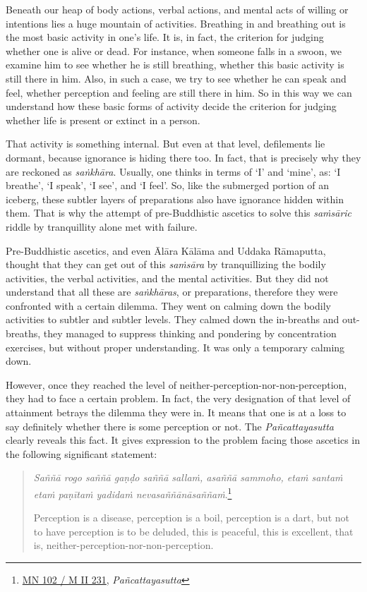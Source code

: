 Beneath our heap of body actions, verbal actions, and mental acts of willing or intentions lies a huge mountain of activities. Breathing in and breathing out is the most basic activity in one's life. It is, in fact, the criterion for judging whether one is alive or dead. For instance, when someone falls in a swoon, we examine him to see whether he is still breathing, whether this basic activity is still there in him. Also, in such a case, we try to see whether he can speak and feel, whether perception and feeling are still there in him. So in this way we can understand how these basic forms of activity decide the criterion for judging whether life is present or extinct in a person.

That activity is something internal. But even at that level, defilements lie dormant, because ignorance is hiding there too. In fact, that is precisely why they are reckoned as \emph{saṅkhāra}. Usually, one thinks in terms of `I' and `mine', as: `I breathe', `I speak', `I see', and `I feel'. So, like the submerged portion of an iceberg, these subtler layers of preparations also have ignorance hidden within them. That is why the attempt of pre-Buddhistic ascetics to solve this \emph{saṁsāric} riddle by tranquillity alone met with failure.

Pre-Buddhistic ascetics, and even Ālāra Kālāma and Uddaka Rāmaputta, thought that they can get out of this \emph{saṁsāra} by tranquillizing the bodily activities, the verbal activities, and the mental activities. But they did not understand that all these are \emph{saṅkhāras}, or preparations, therefore they were confronted with a certain dilemma. They went on calming down the bodily activities to subtler and subtler levels. They calmed down the in-breaths and out-breaths, they managed to suppress thinking and pondering by concentration exercises, but without proper understanding. It was only a temporary calming down.

However, once they reached the level of neither-perception-nor-non-perception, they had to face a certain problem. In fact, the very designation of that level of attainment betrays the dilemma they were in. It means that one is at a loss to say definitely whether there is some perception or not. The \emph{Pañcattayasutta} clearly reveals this fact. It gives expression to the problem facing those ascetics in the following significant statement:

\begin{quote}
\emph{Saññā rogo saññā gaṇḍo saññā sallaṁ, asaññā sammoho, etaṁ santaṁ etaṁ paṇītaṁ yadidaṁ nevasaññānāsaññaṁ}.\footnote{\href{https://suttacentral.net/mn102/pli/ms}{MN 102 / M II 231}, \emph{Pañcattayasutta}}

Perception is a disease, perception is a boil, perception is a dart, but not to have perception is to be deluded, this is peaceful, this is excellent, that is, neither-perception-nor-non-perception.
\end{quote}

